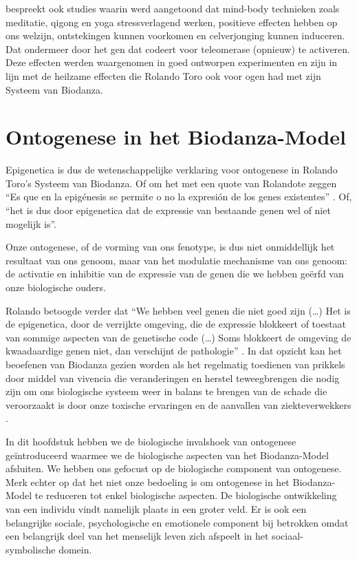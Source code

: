 \documentclass[
  11pt,
]{book}
\begin{document}
\citet{BlackburnEpel2017} bespreekt ook studies waarin werd aangetoond dat mind-body technieken zoals meditatie, qigong en yoga stressverlagend werken, positieve effecten hebben op ons welzijn, ontstekingen kunnen voorkomen en celverjonging kunnen induceren. Dat ondermeer door het gen dat codeert voor teleomerase (opnieuw) te activeren. Deze effecten werden waargenomen in goed ontworpen experimenten en zijn in lijn met de heilzame effecten die Rolando Toro ook voor ogen had met zijn Systeem van Biodanza.

\hypertarget{ontogenese-in-het-biodanza-model}{%
\section{Ontogenese in het Biodanza-Model}\label{ontogenese-in-het-biodanza-model}}

Epigenetica is dus de wetenschappelijke verklaring voor ontogenese in Rolando Toro's Systeem van Biodanza. Of om het met een quote van Rolandote zeggen ``Es que en la epigénesis
se permite o no la expresión de los genes existentes'' \citep{Montanari2023}. Of, ``het is dus door epigenetica dat de expressie van bestaande genen wel of niet mogelijk is''.

Onze ontogenese, of de vorming van ons fenotype, is dus niet onmiddellijk het resultaat van ons genoom, maar van het modulatie mechanisme van ons genoom: de activatie en inhibitie van de expressie van de genen die we hebben geërfd van onze biologische ouders.

Rolando betoogde verder dat ``We hebben veel genen die niet goed zijn (\ldots) Het is de epigenetica, door de verrijkte omgeving, die de expressie blokkeert of toestaat van sommige aspecten van de genetische code (\ldots) Soms blokkeert de omgeving de kwaadaardige genen niet, dan verschijnt de pathologie'' \citep{Montanari2023}. In dat opzicht kan het beoefenen van Biodanza gezien worden als het regelmatig toedienen van prikkels door middel van vivencia die veranderingen en herstel teweegbrengen die nodig zijn om ons biologische systeem weer in balans te brengen van de schade die veroorzaakt is door onze toxische ervaringen en de aanvallen van ziekteverwekkers \citep{Montanari2023}.

In dit hoofdstuk hebben we de biologische invalshoek van ontogenese geïntroduceerd waarmee we de biologische aspecten van het Biodanza-Model afsluiten. We hebben ons gefocust op de biologische component van ontogenese. Merk echter op dat het niet onze bedoeling is om ontogenese in het Biodanza-Model te reduceren tot enkel biologische aspecten. De biologische ontwikkeling van een individu vindt namelijk plaats in een groter veld. Er is ook een belangrijke sociale, psychologische en emotionele component bij betrokken omdat een belangrijk deel van het menselijk leven zich afspeelt in het sociaal-symbolische domein.
\end{document}
